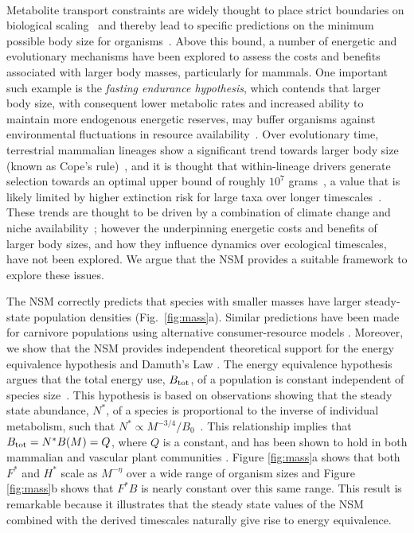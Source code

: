 \documentclass[twocolumn,preprintnumbers,amsmath,amssymb,superscriptaddress]{revtex4}
\begin{document}
\begin{bibunit}[unsrt]
\\
Metabolite transport constraints are widely thought to place strict boundaries on biological scaling~\citep{Brown:1993p708,West:1997cg,Brown:2004wq} and thereby lead to specific predictions on the minimum possible body size for organisms~\citep{West:2002ud}.
Above this bound, a number of energetic and evolutionary mechanisms have been explored to assess the costs and benefits associated with larger body masses, particularly for mammals.
One important such example is the \emph{fasting endurance hypothesis}, which contends that larger body size, with consequent lower metabolic rates and increased ability to maintain more endogenous energetic reserves, may buffer organisms against environmental fluctuations in resource availability~\citep{Millar:1990p923}.
Over evolutionary time, terrestrial mammalian lineages show a significant trend towards larger body size (known as Cope's rule)~\citep{Alroy:1998p1594,Clauset:2009fh,Smith:2010p3442,Saarinen:2014br}, and it is thought that within-lineage drivers generate selection towards an optimal upper bound of roughly $10^7$ grams~\citep{Alroy:1998p1594}, a value that is likely limited by higher extinction risk for large taxa over longer timescales~\citep{Clauset:2009fh}.
These trends are thought to be driven by a combination of climate change and niche availability~\citep{Saarinen:2014br}; however the underpinning energetic costs and benefits of larger body sizes, and how they influence dynamics over ecological timescales, have not been explored.
We argue that the NSM provides a suitable framework to explore these issues.



The NSM correctly predicts that species with smaller masses have larger steady-state population densities (Fig.~\ref{fig:mass}a).
Similar predictions have been made for carnivore populations using alternative consumer-resource models \citep{DeLong:2012kw}.
Moreover, we show that the NSM provides independent theoretical support for the energy equivalence hypothesis and Damuth's Law \citep{Damuth:1987kr,allen2002,enquist1998}.
The energy equivalence hypothesis argues that the total energy use, $B_{\rm tot}$, of a population is constant independent of species size~\citep{Damuth:1987kr,allen2002,enquist1998}. %
This hypothesis is based on observations showing that the steady state abundance, $N^*$, of a species is proportional to the inverse of individual metabolism, such that $N^*\propto M^{-3/4}/B_{0}$~\citep{allen2002,enquist1998}.
This relationship implies that $B_{\rm tot}=N^*B(M)=Q$, where $Q$ is a constant, and has been shown to hold in both mammalian and vascular plant communities \citep{Damuth:1987kr,allen2002,enquist1998}.
Figure \ref{fig:mass}a shows that both $F^{*}$ and $H^{*}$ scale as $M^{-\eta}$ over a wide range of organism sizes and Figure \ref{fig:mass}b shows that $F^{*}B$ is nearly constant over this same range.
This result is remarkable because it illustrates that the steady state values of the NSM combined with the derived timescales naturally give rise to energy equivalence.



\end{bibunit}
\end{document}
